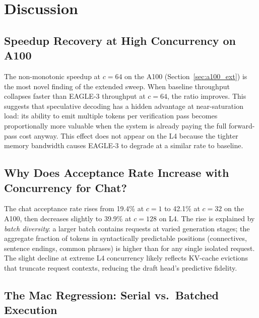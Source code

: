 \documentclass[10pt,twocolumn]{article}
\begin{document}

\section{Discussion}
\label{sec:discussion}

\subsection{Speedup Recovery at High Concurrency on A100}

The non-monotonic speedup at $c=64$ on the A100 (Section~\ref{sec:a100_ext})
is the most novel finding of the extended sweep.  When baseline
throughput collapses faster than EAGLE-3 throughput at $c=64$, the ratio
improves.  This suggests that speculative decoding has a hidden advantage at
near-saturation load: its ability to emit multiple tokens per verification pass
becomes proportionally more valuable when the system is already paying the full
forward-pass cost anyway.  This effect does not appear on the L4 because the
tighter memory bandwidth causes EAGLE-3 to degrade at a similar rate to baseline.

\subsection{Why Does Acceptance Rate Increase with Concurrency for Chat?}

The chat acceptance rate rises from 19.4\% at $c=1$ to 42.1\% at $c=32$ on the
A100, then decreases slightly to 39.9\% at $c=128$ on L4.  The rise is explained
by \emph{batch diversity}: a larger batch contains requests at varied generation
stages; the aggregate fraction of tokens in syntactically predictable positions
(connectives, sentence endings, common phrases) is higher than for any single
isolated request.  The slight decline at extreme L4 concurrency likely reflects
KV-cache evictions that truncate request contexts, reducing the draft head's
predictive fidelity.

\subsection{The Mac Regression: Serial vs.\ Batched Execution}
\end{document}
